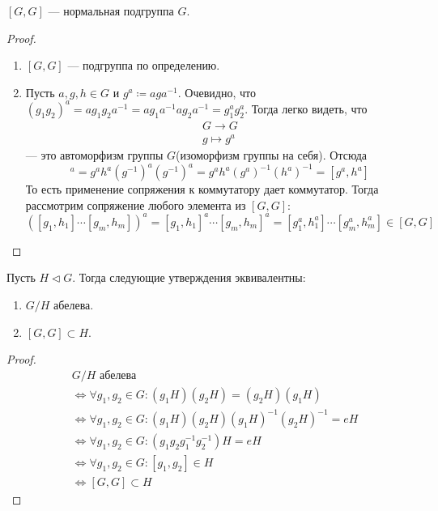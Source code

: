 \documentclass[../main.tex]{subfiles}
\begin{document}
\begin{theorem-non}
\label{non:6.18}
  $[G, G]$ --- нормальная подгруппа $G$.
\end{theorem-non}
\begin{proof}
  \begin{enumerate}
    \item $[G, G]$ --- подгруппа по определению.
    \item Пусть $a, g, h \in G$ и $g^a \coloneqq aga^{-1}$. Очевидно, что $(g_1g_2)^a = ag_1g_2a^{-1} = ag_1a^{-1}ag_2a^{-1} = g_1^ag_2^a$. Тогда легко видеть, что
    \begin{equation*}
      \begin{gathered}
        G \longrightarrow G\\
        g \mapsto g^a
      \end{gathered}
    \end{equation*}
    --- это автоморфизм группы $G$(изоморфизм группы на себя). Отсюда
    \begin{equation*}
      [g, h]^a = g^ah^a(g^{-1})^a(g^{-1})^a =
      g^ah^a(g^a)^{-1}(h^a)^{-1} = [g^a, h^a]
    \end{equation*}
    То есть применение сопряжения к коммутатору дает коммутатор. Тогда рассмотрим сопряжение любого элемента из $[G, G]$:
    \begin{equation*}
      ([g_1, h_1] \dotsm [g_m, h_m])^a
      =
      [g_1,h_1]^a \dotsm [g_m, h_m]^a
      =
      [g_1^a, h_1^a] \dotsm [g_m^a, h_m^a]
      \in [G, G]
    \end{equation*}
  \end{enumerate}
\end{proof}

\begin{theorem-non}
\label{non:6.19}
  Пусть $H \triangleleft G$. Тогда следующие утверждения эквивалентны:
  \begin{enumerate}
    \item $G/H$ абелева.
    \item $[G, G] \subset H$.
  \end{enumerate}
\end{theorem-non}
\begin{proof}
  \begin{align*}
    &G/H\text{ абелева } \\
    &\iff
    \forall g_1, g_2 \in G\colon (g_1H)(g_2H) = (g_2H)(g_1H) \\
    &\iff
    \forall g_1, g_2 \in G\colon (g_1H)(g_2H)(g_1H)^{-1}(g_2H)^{-1} = eH \\
    &\iff
    \forall g_1, g_2 \in G\colon (g_1g_2g_1^{-1}g_2^{-1})H = eH \\
    &\iff
    \forall g_1, g_2 \in G\colon [g_1, g_2] \in H \\
    &\iff
    [G, G] \subset H
  \end{align*}
\end{proof}
\end{document}
